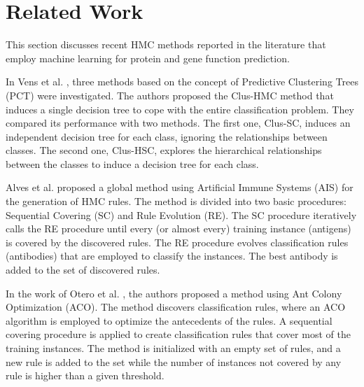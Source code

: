 \section{Related Work}\label{sec:relatedWork}

This section discusses recent HMC methods reported in the literature that employ machine learning for protein and gene function prediction.

In Vens et al. \cite{Vens2008}, three methods based on the concept of Predictive Clustering Trees (PCT) were investigated. The authors proposed the Clus-HMC method that induces a single decision tree to cope with the entire classification problem. They compared its performance with two methods. The first one, Clus-SC, induces an independent decision tree for each class, ignoring the relationships between classes. The second one, Clus-HSC, explores the hierarchical relationships between the classes to induce a decision tree for each class. %

Alves et al. \cite{Alves2010} proposed a global method using Artificial Immune Systems (AIS) for the generation of HMC rules. The method is divided into two basic procedures: Sequential Covering (SC) and Rule Evolution (RE). The SC procedure iteratively calls the RE procedure until every (or almost every) training instance (antigens) is covered by the discovered rules. The RE procedure evolves classification rules (antibodies) that are employed to classify the instances. The best antibody is added to the set of discovered rules.


In the work of Otero et al. \cite{Otero2010}, the authors proposed a method using Ant Colony Optimization (ACO). The method discovers classification rules, where an ACO algorithm is employed to optimize the antecedents of the rules. A sequential covering procedure is applied to create classification rules that cover most of the training instances. The method is initialized with an empty set of rules, and a new rule is added to the set while the number of instances not covered by any rule is higher than a given threshold. 

